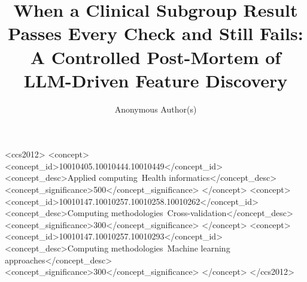 \documentclass[sigconf,anonymous,review]{acmart}
\begin{document}
\title{When a Clinical Subgroup Result Passes Every Check and Still Fails:
       A Controlled Post-Mortem of LLM-Driven Feature Discovery}

\author{Anonymous Author(s)}



\begin{CCSXML}
<ccs2012>
<concept>
<concept_id>10010405.10010444.10010449</concept_id>
<concept_desc>Applied computing~Health informatics</concept_desc>
<concept_significance>500</concept_significance>
</concept>
<concept>
<concept_id>10010147.10010257.10010258.10010262</concept_id>
<concept_desc>Computing methodologies~Cross-validation</concept_desc>
<concept_significance>300</concept_significance>
</concept>
<concept>
<concept_id>10010147.10010257.10010293</concept_id>
<concept_desc>Computing methodologies~Machine learning approaches</concept_desc>
<concept_significance>300</concept_significance>
</concept>
</ccs2012>
\end{CCSXML}



\maketitle












\end{document}
